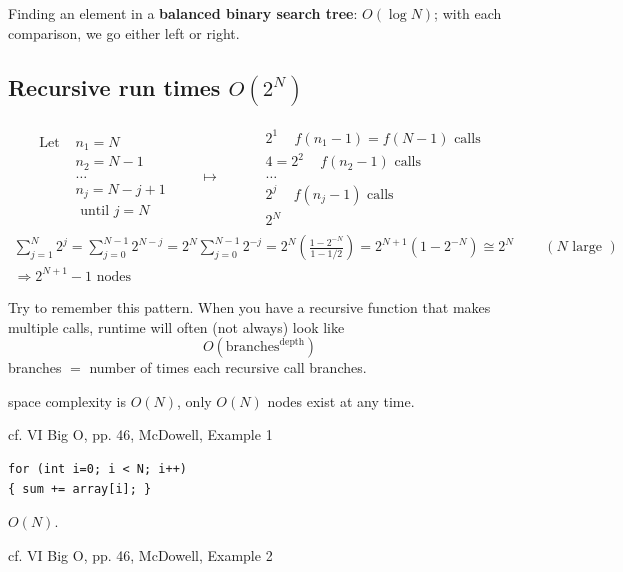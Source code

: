 \documentclass[10pt]{amsart}
\begin{document}
\begin{multicols*}{2}
Finding an element in a \textbf{balanced binary search tree}: $O(\log{N})$; with each comparison, we go either left or right.

\subsection{Recursive run times $O(2^N)$}

\[
\begin{gathered}
	\begin{aligned}
	\text{ Let } & n_1 = N \\
	& n_2 = N - 1 \\
	& \dots  \\
	& n_j = N - j + 1 \\
	& \text{ until } j = N 
	\end{aligned} \qquad \mapsto \qquad 
	\begin{aligned}
	& 2^1 \quad \, f(n_1 - 1) = f(N-1) \text{ calls } \\ 
	& 4 = 2^2 \quad \, f(n_2- 1) \text{ calls }  \\
	& \dots \\
	& 2^j \quad \, f(n_j - 1) \text{ calls }  \\
	& 2^N 
	\end{aligned}
\end{gathered}
\]
\[
\begin{gathered}
	\sum_{j=1}^N 2^j = \sum_{j=0}^{N-1} 2^{N-j} = 2^N \sum_{j=0}^{N-1} 2^{-j} = 2^N \left(\frac{ 1 - 2^{-N} }{ 1 - 1/2} \right) = 2^{N+1} (1- 2^{-N}) \cong 2^N \qquad \, (N \text{ large }) \\ 
 \Longrightarrow 2^{N+1} -1 \text{ nodes } 
\end{gathered}
\]

Try to remember this pattern. When you have a recursive function that makes multiple calls, runtime will often (not always) look like
\begin{equation}
	\boxed{ O(\text{branches}^{\text{depth}}) }
\end{equation}
branches $=$ number of times each recursive call branches.

space complexity is $O(N)$, only $O(N)$ nodes exist at any time.

cf. VI Big O, pp. 46, McDowell, Example 1

\begin{verbatim}
for (int i=0; i < N; i++)
{ sum += array[i]; }
\end{verbatim}
$O(N)$.

cf. VI Big O, pp. 46, McDowell, Example 2


\end{multicols*}
\end{document}

